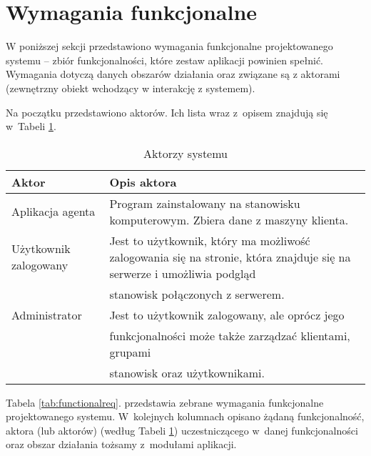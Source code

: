 \section {Wymagania funkcjonalne}
W poniższej sekcji przedstawiono wymagania funkcjonalne projektowanego systemu -- zbiór funkcjonalności, które zestaw aplikacji powinien spełnić. Wymagania dotyczą danych obszarów działania oraz związane są z aktorami (zewnętrzny obiekt wchodzący w interakcję z systemem).

Na początku przedstawiono aktorów. Ich lista wraz z~opisem znajdują się w~Tabeli \ref{tab:actors}.

\begin{table}[!ht]
\caption{Aktorzy systemu}
\label{tab:actors}
\begin{tabular}{| m{} | m{11cm} |} \hline
Aktor & Opis aktora \\ \hline
Aplikacja agenta   & Program zainstalowany na stanowisku                        komputerowym. Zbiera dane z maszyny klienta.\\ \hline

Użytkownik zalogowany  & Jest to użytkownik, który ma możliwość                              zalogowania się na stronie, która znajduje się na                         serwerze i umożliwia podgląd\\
                       
                        & stanowisk połączonych z serwerem. \\ \hline

Administrator   & Jest to użytkownik zalogowany, ale oprócz jego \\                                      &funkcjonalności może także zarządzać klientami, grupami \\
                &stanowisk oraz użytkownikami. \\ \hline

\end{tabular}
\end{table}

\newpage

Tabela \ref{tab:functionalreq}. przedstawia zebrane wymagania funkcjonalne projektowanego systemu. W~kolejnych kolumnach opisano żądaną funkcjonalność, aktora (lub aktorów) (według Tabeli \ref{tab:actors}) uczestniczącego w~danej funkcjonalności oraz obszar działania tożsamy z~modułami aplikacji.

